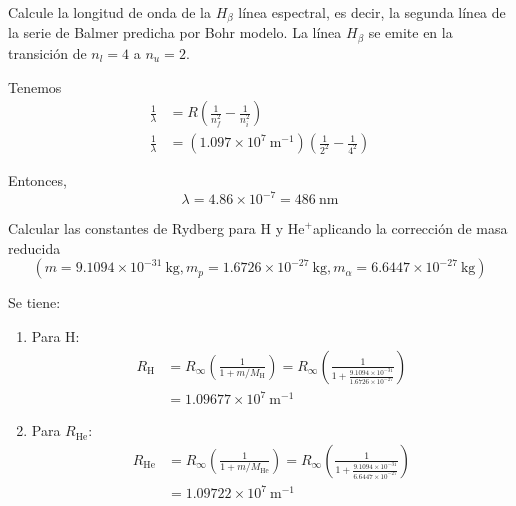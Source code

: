 \begin{problema}[Problema 13]
    Calcule la longitud de onda de la $H_{\beta}$ línea espectral, es decir, la segunda línea de la serie de Balmer predicha por Bohr modelo. La línea $H_{\beta}$ se emite en la transición de $n_{l}=4$ a $n_{u}=2$.
    \begin{sol}
        Tenemos 
        \begin{align*}
            \frac{1}{\lambda} &=R\left(\frac{1}{n_f^2}-\frac{1}{n_i^2}\right)\\
            \frac{1}{\lambda} &=\left(1.097 \times 10^7 \mathrm{~m}^{-1}\right)\left(\frac{1}{2^2}-\frac{1}{4^2}\right)
        \end{align*}
        
Entonces, 
$$
\lambda=4.86 \times 10^{-7}=486 \mathrm{~nm}
$$
    \end{sol}
\end{problema}
\begin{problema}[Problema 14] Calcular las constantes de Rydberg para $\mathrm{H}$ y $\mathrm{He}^{+}$aplicando la corrección de masa reducida $$\left(m=9.1094 \times 10^{-31} \mathrm{~kg}, m_{p}=1.6726 \times 10^{-27} \mathrm{~kg}, m_{\alpha}=6.6447 \times 10^{-27} \mathrm{~kg}\right)$$
    \begin{sol}
        Se tiene:
        \begin{enumerate}
            \item Para $\mathrm{H}$:
            $$
        \begin{aligned}
        R_{\mathrm{H}} &=R_{\infty}\left(\frac{1}{1+m / M_{\mathrm{H}}}\right)=R_{\infty}\left(\frac{1}{1+\frac{9.1094 \times 10^{-31}}{ 1.6726 \times 10^{-27}}}\right) \\
        &=1.09677 \times 10^7 \mathrm{~m}^{-1}
        \end{aligned}
        $$
        \item Para $R_{\mathrm{He}}$: 
        $$
        \begin{aligned}
        R_{\mathrm{He}} &=R_{\infty}\left(\frac{1}{1+m / M_{\mathrm{He}}}\right)=R_{\infty}\left(\frac{1}{1+\frac{9.1094 \times 10^{-31}}{ 6.6447 \times 10^{-27}}}\right) \\
        &=1.09722 \times 10^7 \mathrm{~m}^{-1}
        \end{aligned}
        $$
        \end{enumerate}
        

       
    \end{sol}
\end{problema}


    
    





%
%

